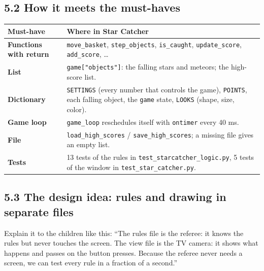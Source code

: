 \documentclass[level=2,teacher]{kidscode}
\begin{document}
\subsection{5.2 How it meets the must-haves}
\begin{tabularx}{\linewidth}{@{}>{\bfseries}p{4.2cm}X@{}}
\toprule
Must-have & Where in Star Catcher \\ \midrule
Functions with return & \texttt{move\_basket}, \texttt{step\_objects}, \texttt{is\_caught}, \texttt{update\_score}, \texttt{add\_score}, \ldots \\
List & \texttt{game["objects"]}: the falling stars and meteors; the high-score list. \\
Dictionary & \texttt{SETTINGS} (every number that controls the game), \texttt{POINTS}, each falling object, the \texttt{game} state, \texttt{LOOKS} (shape, size, color). \\
Game loop & \texttt{game\_loop} reschedules itself with \texttt{ontimer} every 40 ms. \\
File & \texttt{load\_high\_scores} / \texttt{save\_high\_scores}; a missing file gives an empty list. \\
Tests & 13 tests of the rules in \texttt{test\_starcatcher\_logic.py}, 5 tests of the window in \texttt{test\_star\_catcher.py}. \\
\bottomrule
\end{tabularx}

\subsection{5.3 The design idea: rules and drawing in separate files}
\begin{center}
\end{center}
Explain it to the children like this: \enquote{The rules file is the referee: it knows the rules but never
touches the screen. The view file is the TV camera: it shows what happens and passes on the button
presses. Because the referee never needs a screen, we can test every rule in a fraction of a second.}
\end{document}
